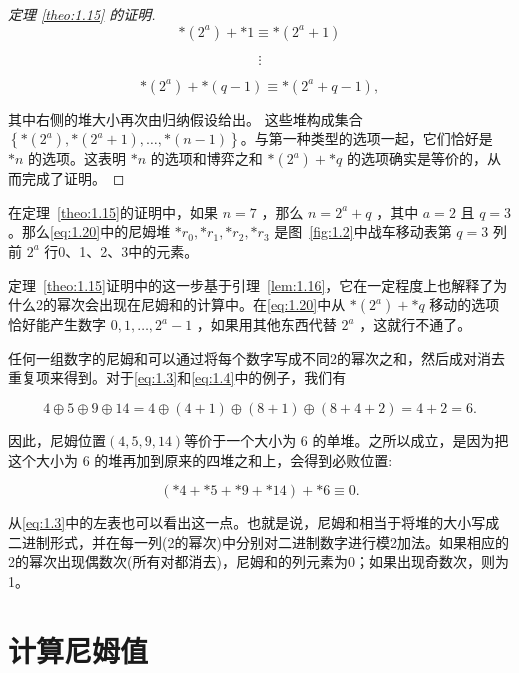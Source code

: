 \begin{proof}[定理 \ref{theo:1.15} 的证明]
\[
* \left( {2}^{a}\right)  +  * 1 \equiv   * \left( {{2}^{a} + 1}\right)
\]

\[
\vdots
\]

\[
* \left( {2}^{a}\right)  +  * \left( {q - 1}\right)  \equiv   * \left( {{2}^{a} + q - 1}\right) ,
\]

其中右侧的堆大小再次由归纳假设给出。 这些堆构成集合 \(\left\{  {*\left( {2}^{a}\right) , * \left( {{2}^{a} + 1}\right) ,\ldots , * \left( {n - 1}\right) }\right\}\)。与第一种类型的选项一起，它们恰好是 \(* n\) 的选项。这表明 \(* n\) 的选项和博弈之和 \(* \left( {2}^{a}\right)  +  * q\) 的选项确实是等价的，从而完成了证明。
\end{proof}

在定理~\ref{theo:1.15}的证明中，如果 \(n = 7\) ，那么 \(n = {2}^{a} + q\) ，其中 \(a = 2\) 且 \(q = 3\) 。那么\eqref{eq:1.20}中的尼姆堆 \(* {r}_{0}, * {r}_{1}, * {r}_{2}, * {r}_{3}\) 是图~\ref{fig:1.2}中战车移动表第 \(q = 3\) 列前 \({2}^{a}\) 行0、1、2、3中的元素。

定理~\ref{theo:1.15}证明中的这一步基于引理~\ref{lem:1.16}，它在一定程度上也解释了为什么2的幂次会出现在尼姆和的计算中。在\eqref{eq:1.20}中从 \(* \left( {2}^{a}\right)  +  * q\) 移动的选项恰好能产生数字 \(0,1,\ldots ,{2}^{a} - 1\) ，如果用其他东西代替 \({2}^{a}\) ，这就行不通了。

任何一组数字的尼姆和可以通过将每个数字写成不同2的幂次之和，然后成对消去重复项来得到。对于\eqref{eq:1.3}和\eqref{eq:1.4}中的例子，我们有

\begin{equation}\label{eq:1.21}
4 \oplus  5 \oplus  9 \oplus  {14} = 4 \oplus  \left( {4 + 1}\right)  \oplus  \left( {8 + 1}\right)  \oplus  \left( {8 + 4 + 2}\right)  = 4 + 2 = 6. 
\end{equation}

因此，尼姆位置$(4,5,9,14)$等价于一个大小为 6 的单堆。之所以成立，是因为把这个大小为 6 的堆再加到原来的四堆之和上，会得到必败位置:

\[
\left( {*4 +  * 5 +  * 9 +  * {14}}\right)  +  * 6 \equiv  0.
\]

从\eqref{eq:1.3}中的左表也可以看出这一点。也就是说，尼姆和相当于将堆的大小写成二进制形式，并在每一列(2的幂次)中分别对二进制数字进行模2加法。如果相应的2的幂次出现偶数次(所有对都消去)，尼姆和的列元素为0；如果出现奇数次，则为1。

\section{计算尼姆值}\label{sec-1.7}

